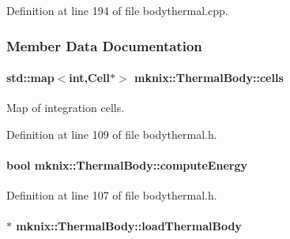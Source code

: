 Definition at line 194 of file bodythermal.\+cpp.



\subsubsection{Member Data Documentation}
\hypertarget{classmknix_1_1_thermal_body_a2af2b78c8e31929211f88a5a49072c06}{}
\paragraph[{cells}]{\setlength{\rightskip}{0pt plus 5cm}std\+::map$<$int,{\bf Cell}$\ast$$>$ mknix\+::\+Thermal\+Body\+::cells\hspace{0.3cm}{\ttfamily [protected]}}\label{classmknix_1_1_thermal_body_a2af2b78c8e31929211f88a5a49072c06}
Map of integration cells. 

Definition at line 109 of file bodythermal.\+h.

\hypertarget{classmknix_1_1_thermal_body_a097e16dfcc1491dc659608f1392a504f}{}
\paragraph[{compute\+Energy}]{\setlength{\rightskip}{0pt plus 5cm}bool mknix\+::\+Thermal\+Body\+::compute\+Energy\hspace{0.3cm}{\ttfamily [protected]}}\label{classmknix_1_1_thermal_body_a097e16dfcc1491dc659608f1392a504f}


Definition at line 107 of file bodythermal.\+h.

\hypertarget{classmknix_1_1_thermal_body_a30a30d13eef83ca7f39a7b0236c43dcd}{}
\paragraph[{load\+Thermal\+Body}]{$\ast$ mknix\+::\+Thermal\+Body\+::load\+Thermal\+Body\hspace{0.3cm}{\ttfamily [protected]}}\label{classmknix_1_1_thermal_body_a30a30d13eef83ca7f39a7b0236c43dcd}


